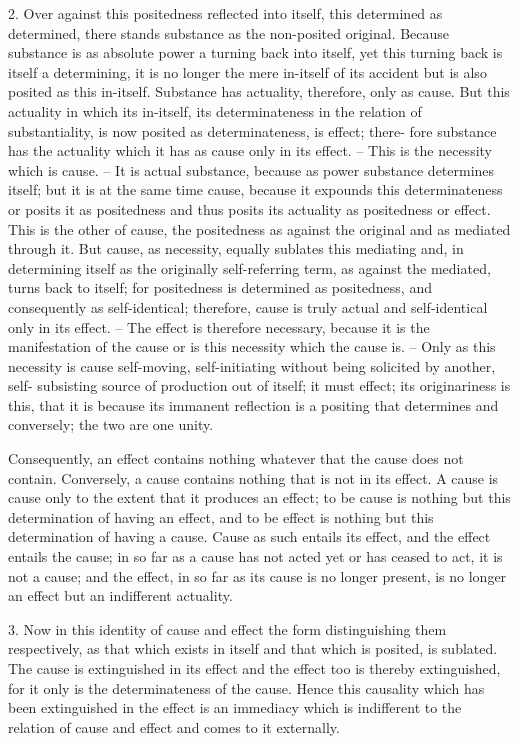 2. Over against this positedness reflected into itself, this determined as
determined, there stands substance as the non-posited original. Because
substance is as absolute power a turning back into itself, yet this turning
back is itself a determining, it is no longer the mere in-itself of its accident
but is also posited as this in-itself. Substance has actuality, therefore, only
as cause. But this actuality in which its in-itself, its determinateness in the
relation of substantiality, is now posited as determinateness, is effect; there-
fore substance has the actuality which it has as cause only in its effect. –
This is the necessity which is cause. – It is actual substance, because as
power substance determines itself; but it is at the same time cause, because
it expounds this determinateness or posits it as positedness and thus
posits its actuality as positedness or effect. This is the other of cause, the
positedness as against the original and as mediated through it. But cause,
as necessity, equally sublates this mediating and, in determining itself as
the originally self-referring term, as against the mediated, turns back to
itself; for positedness is determined as positedness, and consequently as
self-identical; therefore, cause is truly actual and self-identical only in its
effect. – The effect is therefore necessary, because it is the manifestation of
the cause or is this necessity which the cause is. – Only as this necessity is
cause self-moving, self-initiating without being solicited by another, self-
subsisting source of production out of itself; it must effect; its originariness is
this, that it is because its immanent reflection is a positing that determines
and conversely; the two are one unity.

Consequently, an effect contains nothing whatever that the cause does not
contain. Conversely, a cause contains nothing that is not in its effect. A cause
is cause only to the extent that it produces an effect; to be cause is nothing
but this determination of having an effect, and to be effect is nothing but this
determination of having a cause. Cause as such entails its effect, and the
effect entails the cause; in so far as a cause has not acted yet or has ceased
to act, it is not a cause; and the effect, in so far as its cause is no longer
present, is no longer an effect but an indifferent actuality.

3. Now in this identity of cause and effect the form distinguishing them
respectively, as that which exists in itself and that which is posited, is
sublated. The cause is extinguished in its effect and the effect too is thereby
extinguished, for it only is the determinateness of the cause. Hence this
causality which has been extinguished in the effect is an immediacy which
is indifferent to the relation of cause and effect and comes to it externally.


